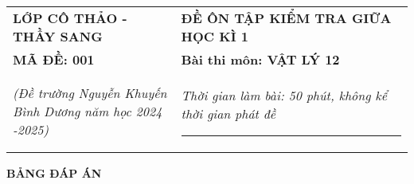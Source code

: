 \begin{tabular}{M{6.5cm}M{11cm}}
	\textbf{LỚP CÔ THẢO - THẦY SANG}& \textbf{ĐỀ ÔN TẬP KIỂM TRA GIỮA HỌC KÌ 1}\\
	\textbf{MÃ ĐỀ: 001}& \textbf{Bài thi môn: VẬT LÝ 12}\\
	\textit{(Đề trường Nguyễn Khuyến \newline Bình Dương năm học 2024 -2025)}& \textit{Thời gian làm bài: 50 phút, không kể thời gian phát đề}
	
	\noindent\rule{4cm}{0.8pt} \\
\end{tabular}
\setcounter{section}{0}
\begin{center}
	\textbf{\large BẢNG ĐÁP ÁN}
\end{center}
\section{}
\section{}
\section{}




